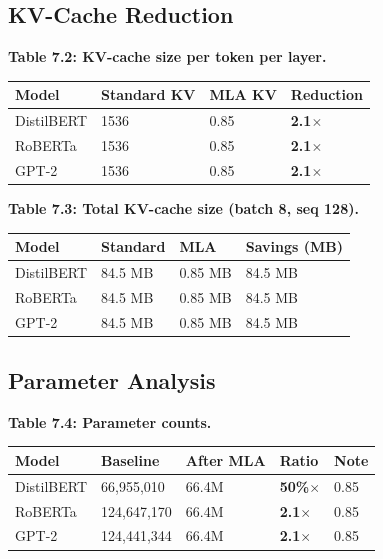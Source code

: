 \subsection{KV-Cache Reduction}

\textbf{Table 7.2: KV-cache size per token per layer.}

\begin{table}[H]
\centering
\small
\begin{tabular}{llll}
\toprule
\textbf{Model} & \textbf{Standard KV} & \textbf{MLA KV} & \textbf{Reduction} \\
\midrule
DistilBERT & 1536 & 0.85 & \textbf{2.1$\times$} \\
RoBERTa & 1536 & 0.85 & \textbf{2.1$\times$} \\
GPT-2 & 1536 & 0.85 & \textbf{2.1$\times$} \\
\bottomrule
\end{tabular}
\end{table}

\textbf{Table 7.3: Total KV-cache size (batch 8, seq 128).}

\begin{table}[H]
\centering
\small
\begin{tabular}{llll}
\toprule
\textbf{Model} & \textbf{Standard} & \textbf{MLA} & \textbf{Savings (MB)} \\
\midrule
DistilBERT & 84.5 MB & 0.85 MB & 84.5 MB \\
RoBERTa & 84.5 MB & 0.85 MB & 84.5 MB \\
GPT-2 & 84.5 MB & 0.85 MB & 84.5 MB \\
\bottomrule
\end{tabular}
\end{table}

\subsection{Parameter Analysis}

\textbf{Table 7.4: Parameter counts.}

\begin{table}[H]
\centering
\small
\begin{tabular}{lllll}
\toprule
\textbf{Model} & \textbf{Baseline} & \textbf{After MLA} & \textbf{Ratio} & \textbf{Note} \\
\midrule
DistilBERT & 66,955,010 & 66.4M & \textbf{50\%$\times$} & 0.85 \\
RoBERTa & 124,647,170 & 66.4M & \textbf{2.1$\times$} & 0.85 \\
GPT-2 & 124,441,344 & 66.4M & \textbf{2.1$\times$} & 0.85 \\
\bottomrule
\end{tabular}
\end{table}

